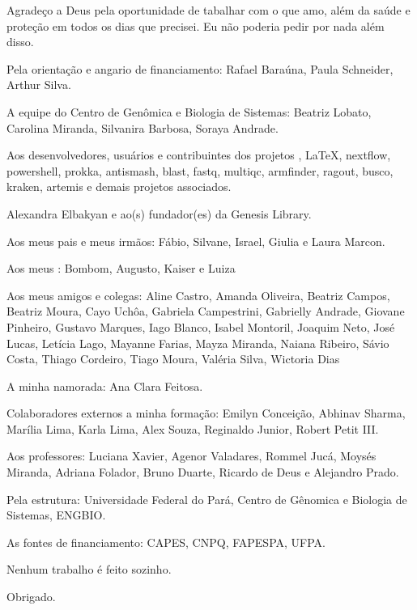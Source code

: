 \begin{agradecimentos}

Agradeço a Deus pela oportunidade de tabalhar com o que amo, além da saúde e proteção em todos os dias
que precisei. Eu não poderia pedir por nada além disso.

Pela orientação e angario de financiamento: Rafael Baraúna, Paula Schneider, Arthur Silva. 

A equipe do Centro de Genômica e Biologia de Sistemas: Beatriz Lobato, Carolina Miranda, Silvanira Barbosa,
Soraya Andrade. 

Aos desenvolvedores, usuários e contribuintes dos projetos \abnTeX, \LaTeX, nextflow, powershell, 
prokka, antismash, blast, fastq, multiqc, armfinder, ragout, busco, kraken, artemis e demais projetos
associados.

Alexandra Elbakyan e ao(s) fundador(es) da Genesis Library.

Aos meus pais e meus irmãos: Fábio, Silvane, Israel, Giulia e Laura Marcon.

Aos meus : Bombom, Augusto, Kaiser e Luiza \textdagger

Aos meus amigos e colegas: Aline Castro, Amanda Oliveira, Beatriz Campos, Beatriz Moura, Cayo Uchôa, 
Gabriela Campestrini, Gabrielly Andrade, Giovane Pinheiro, Gustavo Marques, Iago Blanco, 
Isabel Montoril, Joaquim Neto, José Lucas, Letícia Lago, Mayanne Farias, Mayza Miranda, 
Naiana Ribeiro, Sávio Costa, Thiago Cordeiro, Tiago Moura, Valéria Silva, Wictoria Dias

A minha namorada: Ana Clara Feitosa.

Colaboradores externos a minha formação: Emilyn Conceição, Abhinav Sharma, Marília Lima, Karla Lima, Alex Souza, Reginaldo Junior, Robert Petit III.

Aos professores: Luciana Xavier, Agenor Valadares, Rommel Jucá, Moysés Miranda, Adriana Folador,
Bruno Duarte, Ricardo de Deus e Alejandro Prado.

Pela estrutura: Universidade Federal do Pará, Centro de Gênomica e Biologia de Sistemas, ENGBIO.

As fontes de financiamento: CAPES, CNPQ, FAPESPA, UFPA.

Nenhum trabalho é feito sozinho.

Obrigado.

\end{agradecimentos}
